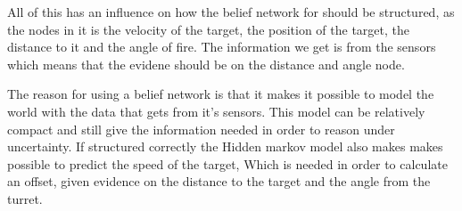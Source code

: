  All of this has an influence on how the belief network for \name should be
 structured, as the nodes in it is the velocity of the target, the position of
 the target, the distance to it and the angle of fire. The information we get is
 from the sensors which means that the evidene should be on the distance and
 angle node.







The reason for using a belief network is that it makes it possible to model the
world with the data that \name gets from it's sensors. This model can be
relatively compact and still give the information needed in order to reason
under uncertainty. If structured correctly the Hidden markov model also makes
makes possible to predict the speed of the target, Which is needed in order to
calculate an offset, given evidence on the distance to the target and the angle
from the turret. 
